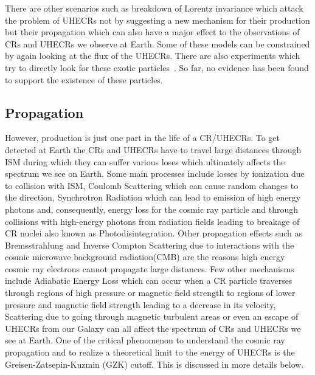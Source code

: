 There are other scenarios such as breakdown of Lorentz invariance which attack the problem of UHECRs not by suggesting a new mechanism for their production but their propagation which can also have a major effect to the observations of CRs and UHECRs we observe at Earth. Some of these models can be constrained by again looking at the flux of the UHECRs. There are also experiments which try to directly look for these exotic particles~\cite{}. So far, no evidence has been found to support the existence of these particles. 

\subsection{Propagation}

However, production is just one part in the life of a CR/UHECRs. To get detected at Earth the CRs and UHECRs have to travel large distances through ISM during which they can suffer various loses which ultimately affects the spectrum we see on Earth. Some main processes include losses by ionization due to collision with ISM, Coulomb Scattering which can cause random changes to the direction, Synchrotron Radiation which can lead to emission of high energy photons and, consequently, energy loss for the cosmic ray particle and through collisions with high-energy photons from radiation fields leading to breakage of CR nuclei also known as Photodisintegration. Other propagation effects such as Bremsstrahlung and Inverse Compton Scattering due to interactions with the cosmic microwave background radiation(CMB)  are the reasons high energy cosmic ray electrons cannot propagate large distances. Few other mechanisms include Adiabatic Energy Loss which can occur when a CR particle traverses through regions of high pressure or magnetic field strength to regions of lower pressure and magnetic field strength leading to a decrease in its velocity, Scattering due to going through magnetic turbulent areas or even an escape of UHECRs from our Galaxy can all affect the spectrum of CRs and UHECRs we see at Earth. One of the critical phenomenon to understand the cosmic ray propagation and to realize a theoretical limit to the energy of UHECRs is the Greisen-Zatsepin-Kuzmin (GZK) cutoff. This is discussed in more details below.

